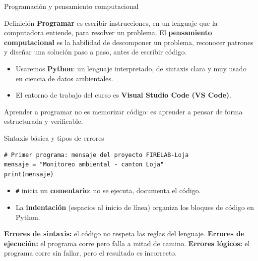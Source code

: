 \documentclass[aspectratio=169,11pt]{beamer}
\begin{document}
\begin{frame}{Programación y pensamiento computacional}
\small
\begin{block}{Definición}
\textbf{Programar} es escribir instrucciones, en un lenguaje que la computadora entiende, para resolver un problema. El \textbf{pensamiento computacional} es la habilidad de descomponer un problema, reconocer patrones y diseñar una solución paso a paso, antes de escribir código.
\end{block}
\vspace{0.1cm}
\begin{itemize}
  \item Usaremos \textbf{Python}: un lenguaje interpretado, de sintaxis clara y muy usado en ciencia de datos ambientales.
  \item El entorno de trabajo del curso es \textbf{Visual Studio Code (VS Code)}.
\end{itemize}
\begin{keybox}[top=2pt,bottom=2pt]
\footnotesize Aprender a programar no es memorizar código: es aprender a pensar de forma estructurada y verificable.
\end{keybox}
\end{frame}

\begin{frame}[fragile]{Sintaxis básica y tipos de errores}
\small
\begin{lstlisting}
# Primer programa: mensaje del proyecto FIRELAB-Loja
mensaje = "Monitoreo ambiental - canton Loja"
print(mensaje)
\end{lstlisting}
\vspace{0.05cm}
\begin{itemize}[itemsep=1pt]
  \item \texttt{\#} inicia un \textbf{comentario}: no se ejecuta, documenta el código.
  \item La \textbf{indentación} (espacios al inicio de línea) organiza los bloques de código en Python.
\end{itemize}
\vspace{0.05cm}
\begin{keybox}[top=2pt,bottom=2pt]
\footnotesize\textbf{Errores de sintaxis:} el código no respeta las reglas del lenguaje. \textbf{Errores de ejecución:} el programa corre pero falla a mitad de camino. \textbf{Errores lógicos:} el programa corre sin fallar, pero el resultado es incorrecto.
\end{keybox}
\end{frame}
\end{document}
